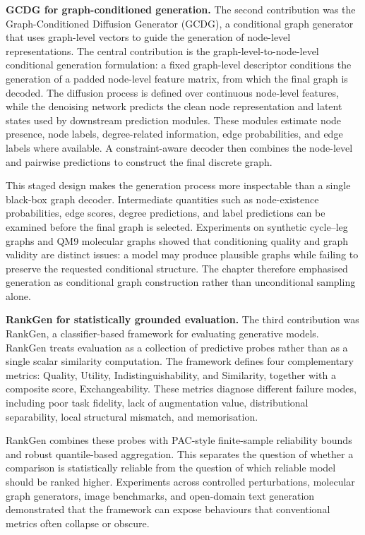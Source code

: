 \textbf{GCDG for graph-conditioned generation.}
The second contribution was the Graph-Conditioned Diffusion Generator (GCDG), a
conditional graph generator that uses graph-level vectors to guide the
generation of node-level representations. The central contribution is the
graph-level-to-node-level conditional generation formulation: a fixed
graph-level descriptor conditions the generation of a padded node-level feature
matrix, from which the final graph is decoded. The diffusion process is defined
over continuous node-level features, while the denoising network predicts the
clean node representation and latent states used by downstream prediction
modules. These modules estimate node presence, node labels, degree-related
information, edge probabilities, and edge labels where available. A
constraint-aware decoder then combines the node-level and pairwise predictions
to construct the final discrete graph.

This staged design makes the generation process more inspectable than a single
black-box graph decoder. Intermediate quantities such as node-existence
probabilities, edge scores, degree predictions, and label predictions can be
examined before the final graph is selected. Experiments on synthetic
cycle--leg graphs and QM9 molecular graphs showed that conditioning quality and
graph validity are distinct issues: a model may produce plausible graphs while
failing to preserve the requested conditional structure. The chapter therefore
emphasised generation as conditional graph construction rather than
unconditional sampling alone.

\textbf{RankGen for statistically grounded evaluation.}
The third contribution was RankGen, a classifier-based framework for evaluating
generative models. RankGen treats evaluation as a collection of predictive
probes rather than as a single scalar similarity computation. The framework
defines four complementary metrics: Quality, Utility, Indistinguishability,
and Similarity, together with a composite score, Exchangeability. These metrics
diagnose different failure modes, including poor
task fidelity, lack of augmentation value, distributional separability, local
structural mismatch, and memorisation.

RankGen combines these probes with PAC-style finite-sample reliability
bounds and robust quantile-based aggregation. This separates the question of
whether a comparison is statistically reliable from the question of which
reliable model should be ranked higher. Experiments across controlled
perturbations, molecular graph
generators, image benchmarks, and open-domain text generation demonstrated that
the framework can expose behaviours that conventional metrics often collapse
or obscure.

